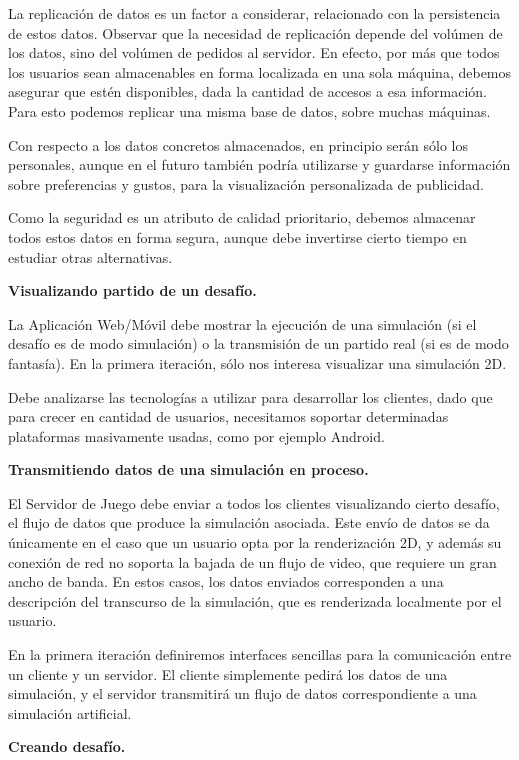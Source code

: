 \documentclass[a4paper, 10pt, twoside]{article}
\begin{document}
La replicación de datos es un factor a considerar, relacionado con la persistencia de estos datos. Observar que la necesidad de replicación depende del volúmen de los datos, sino del volúmen de pedidos al servidor. En efecto, por más que todos los usuarios sean almacenables en forma localizada en una sola máquina, debemos asegurar que estén disponibles, dada la cantidad de accesos a esa información. Para esto podemos replicar una misma base de datos, sobre muchas máquinas.

Con respecto a los datos concretos almacenados, en principio serán sólo los personales, aunque en el futuro también podría utilizarse y guardarse información sobre preferencias y gustos, para la visualización personalizada de publicidad.

Como la seguridad es un atributo de calidad prioritario, debemos almacenar todos estos datos en forma segura, aunque debe invertirse cierto tiempo en estudiar otras alternativas.

\textbf{Visualizando partido de un desafío.}

La Aplicación Web/Móvil debe mostrar la ejecución de una simulación (si el desafío es de modo simulación) o la transmisión de un partido real (si es de modo fantasía). En la primera iteración, sólo nos interesa visualizar una simulación 2D.

Debe analizarse las tecnologías a utilizar para desarrollar los clientes, dado que para crecer en cantidad de usuarios, necesitamos soportar determinadas plataformas masivamente usadas, como por ejemplo Android.

\textbf{Transmitiendo datos de una simulación en proceso.}

El Servidor de Juego debe enviar a todos los clientes visualizando cierto desafío, el flujo de datos que produce la simulación asociada. Este envío de datos se da únicamente en el caso que un usuario opta por la renderización 2D, y además su conexión de red no soporta la bajada de un flujo de video, que requiere un gran ancho de banda. En estos casos, los datos enviados corresponden a una descripción del transcurso de la simulación, que es renderizada localmente por el usuario.

En la primera iteración definiremos interfaces sencillas para la comunicación entre un cliente y un servidor. El cliente simplemente pedirá los datos de una simulación, y el servidor transmitirá un flujo de datos correspondiente a una simulación artificial.

\textbf{Creando desafío.}
\end{document}
